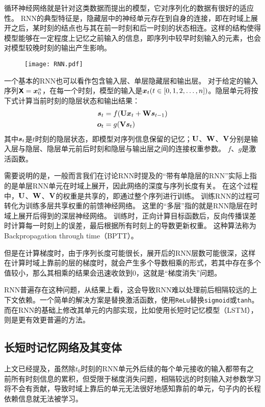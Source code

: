 循环神经网络就是针对这类数据而提出的模型，它对序列化的数据有很好的适应性。
RNN的典型特征是，隐藏层中的神经单元存在到自身的连接，即在时域上展开之后，某时刻的结点也与其在前一时刻和后一时刻的状态相连。这样的结构使得模型能够在一定程度上记忆之前输入的信息，即序列中较早时刻输入的元素，也会对模型较晚时刻的输出产生影响。

\begin{figure}[H]
    \centering
    \texttt{[image: RNN.pdf]}
    \label{fig:RNN}
\end{figure}

一个基本的RNN也可以看作包含输入层、单层隐藏层和输出层。
对于给定的输入序列$\boldsymbol{\mathsf{X}}=\boldsymbol{x}^n_0$，在每一个时刻，模型的输入是$\boldsymbol{x}_t(t \in [0, 1, 2, \dots, n])$。隐层单元将按下式计算当前时刻的隐层状态和输出结果：
\begin{align}
    \boldsymbol{s}_t &= f(\boldsymbol{\mathbf{U}}\boldsymbol{x}_t + \boldsymbol{\mathbf{W}}\boldsymbol{s}_{t-1})\\
    \boldsymbol{o}_t &= g(\boldsymbol{\mathbf{V}}\boldsymbol{s}_t)
\end{align}
其中$\boldsymbol{s}_t$是$t$时刻的隐层状态，即模型对序列信息保留的记忆；$\boldsymbol{\mathbf{U}}$、$\boldsymbol{\mathbf{W}}$、$\boldsymbol{\mathbf{V}}$分别是输入层与隐层、隐层单元前后时刻和隐层与输出层之间的连接权重参数。
$f$、$g$是激活函数。

需要说明的是，一般而言我们在讨论RNN时提及的“带有单隐层的RNN”实际上指的是单层RNN单元在时域上展开，因此网络的深度与序列长度有关。
在这个过程中，$\boldsymbol{\mathbf{U}}$、$\boldsymbol{\mathbf{W}}$、$\boldsymbol{\mathbf{V}}$的权重是共享的，即通过整个序列进行训练。
训练RNN的过程可转化为训练多层共享权重的前馈神经网络。
这里的“多层”指的就是RNN隐层在时域上展开后得到的深层神经网络。
训练时，正向计算目标函数后，反向传播误差时计算每一时刻上的误差，最后根据所有时刻上的导数更新权重。
这种算法称为Backpropagation through time（BPTT）。

但是在计算梯度时，由于序列长度可能很长，展开后的RNN层数可能很深，这样在计算时域上靠前的层的梯度时，就会产生多个导数相乘的形式，若其中存在多个值较小，那么其相乘的结果会迅速收敛到0，这就是“梯度消失”问题。

RNN普遍存在这种问题，从结果上看，这会导致RNN难以处理前后相隔较远的上下文依赖。一个简单的解决方案是替换激活函数，使用\verb|ReLu|替换\verb|sigmoid|或\verb|tanh|。而在RNN的基础上修改其单元的内部实现，比如使用长短时记忆模型（LSTM），则是更有效更普遍的方法。

\subsection{长短时记忆网络及其变体}
上文已经提及，虽然除$t_0$时刻的RNN单元外后续的每个单元接收的输入都带有之前所有时刻信息的累积，但受限于梯度消失问题，相隔较远的时刻输入对参数学习将不会有贡献，导致时域上靠后的单元无法很好地感知靠前的单元，句子内的长程依赖信息就无法被学习。

